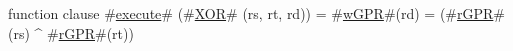 function clause #\hyperref[zexecute]{execute}# (#\hyperref[zXOR]{XOR}# (rs, rt, rd)) =
  {
    #\hyperref[zwGPR]{wGPR}#(rd) = (#\hyperref[zrGPR]{rGPR}#(rs) ^ #\hyperref[zrGPR]{rGPR}#(rt))
  }
